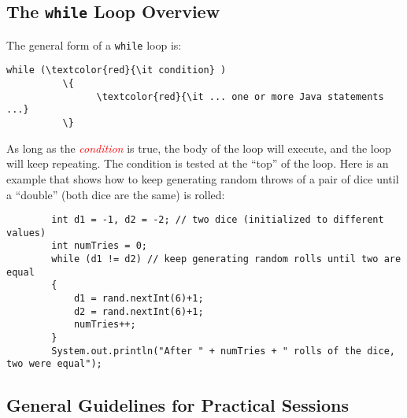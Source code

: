 \vspace{-0.1in}
\subsection*{The {\tt while} Loop Overview}
\vspace*{-.05in}

The general form of a {\tt while} loop is:

\vspace*{-.1in}

\begin{Verbatim}[commandchars=\\\{\}]
          while (\textcolor{red}{\it condition} )
          \{
                \textcolor{red}{\it ... one or more Java statements ...}
          \}
          \end{Verbatim}

          \vspace{-0.15in}

          As long as the \textcolor{red}{\it condition} is true, the body of the loop will execute, and the loop will
          keep repeating. The condition is tested at the ``top'' of the loop.  Here is an example that shows how to keep
          generating random throws of a pair of dice until a ``double'' (both dice are the same) is rolled:

          \vspace{-0.05in}

          \begin{verbatim}
        int d1 = -1, d2 = -2; // two dice (initialized to different values)
        int numTries = 0;
        while (d1 != d2) // keep generating random rolls until two are equal
        {
            d1 = rand.nextInt(6)+1;
            d2 = rand.nextInt(6)+1;
            numTries++;
        }
        System.out.println("After " + numTries + " rolls of the dice, two were equal");
          \end{verbatim}

          \vspace*{-.275in}
          \subsection*{General Guidelines for Practical Sessions}
          \vspace*{-.05in}

